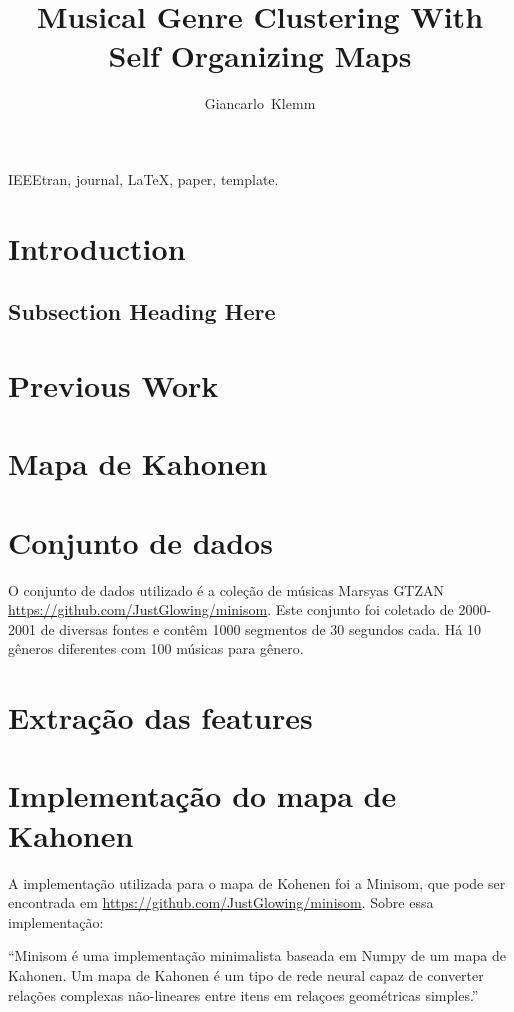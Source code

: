 \documentclass[journal]{IEEEtran}
\begin{document}
\title{Musical Genre Clustering With Self Organizing Maps}
\author{Giancarlo~Klemm}%

\maketitle

\begin{abstract}
\blindtext[1]
\end{abstract}

\begin{IEEEkeywords}
IEEEtran, journal, \LaTeX, paper, template.
\end{IEEEkeywords}

\section{Introduction}
\blindtext

	\subsection{Subsection Heading Here}
	\blindtext
	
\section{Previous Work}
\blindtext

\section{Mapa de Kahonen}
\blindtext

\section{Conjunto de dados}
O conjunto de dados utilizado é a coleção de músicas Marsyas GTZAN \href{https://github.com/JustGlowing/minisom}{https://github.com/JustGlowing/minisom}. Este conjunto foi coletado de 2000-2001 de diversas fontes e contêm 1000 segmentos de 30 segundos cada. Há 10 gêneros diferentes com 100 músicas para gênero.

\section{Extração das features}
\blindtext

\section{Implementação do mapa de Kahonen}
A implementação utilizada para o mapa de Kohenen foi a Minisom, que pode ser encontrada em \href{https://github.com/JustGlowing/minisom}{https://github.com/JustGlowing/minisom}. Sobre essa implementação:
\begin{center}
``Minisom é uma implementação minimalista baseada em Numpy de um mapa de Kahonen. Um mapa de Kahonen é um tipo de rede neural capaz de converter relações complexas não-lineares entre itens em relaçoes geométricas simples.''
\end{center}
\end{document}
